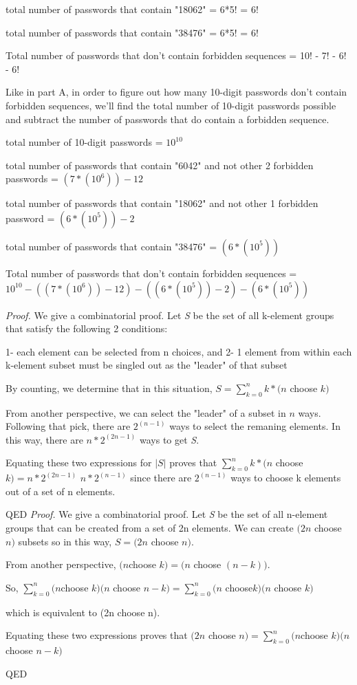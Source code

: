 \documentclass{6042}
\begin{document}
total number of passwords that contain "18062" = 6*5! = 6!

total number of passwords that contain "38476" = 6*5! = 6!

Total number of passwords that don't contain forbidden sequences = 10! - 7! - 6! - 6!

Like in part A, in order to figure out how many 10-digit passwords don't contain forbidden sequences, we'll find the total number of 
10-digit passwords possible and subtract the number of passwords that do contain a forbidden sequence.

total number of 10-digit passwords = $10^{10}$

total number of passwords that contain "6042" and not other 2 forbidden passwords = $(7 * (10^6)) - 12$

total number of passwords that contain "18062" and not other 1 forbidden password = $(6 * (10^5)) - 2$

total number of passwords that contain "38476" = $(6 * (10^5))$

Total number of passwords that don't contain forbidden sequences = $10^{10} - ((7 * (10^6)) - 12) - ((6 * (10^5)) - 2) - (6 * (10^5))$




\textit{Proof.} We give a combinatorial proof. Let \textit{S} be the set of all k-element groups that satisfy the following 2 conditions:

1- each element can be selected from n choices, and
2- 1 element from within each k-element subset must be singled out as the "leader" of that subset

By counting, we determine that in this situation, $S = \sum_{k=0}^{n} k * (n$ choose $k)$

From another perspective, we can select the "leader" of a subset in $n$ ways. Following that pick, there are $2^(n-1)$ ways to select the remaning elements.
In this way, there are $n * 2^(2n-1)$ ways to get \textit{S}.

Equating these two expressions for $|S|$ proves that $\sum_{k=0}^{n} k * (n$ choose $k) = n * 2^(2n-1)$
$n * 2^(n-1)$ since there are $2^(n-1)$ ways to choose k elements out of a set of n elements. 

QED
\textit{Proof.} We give a combinatorial proof. Let \textit{S} be the set of all n-element groups that can be created from a set of 2n elements.
We can create $(2n$ choose $n)$ subsets so in this way, $S = (2n$ choose $n)$.

From another perspective, $(n $choose $k) = (n$ choose $(n-k))$. 

So, $\sum_{k=0}^{n} (n $choose $k) (n$ choose $n-k) = \sum_{k=0}^{n} (n$ choose$ k) (n$ choose $k)$

which is equivalent to (2n choose n). 

Equating these two expressions proves that $(2n$ choose $n) = \sum_{k=0}^{n} (n $choose $k) (n$ choose $n-k)$

QED
\end{document}
